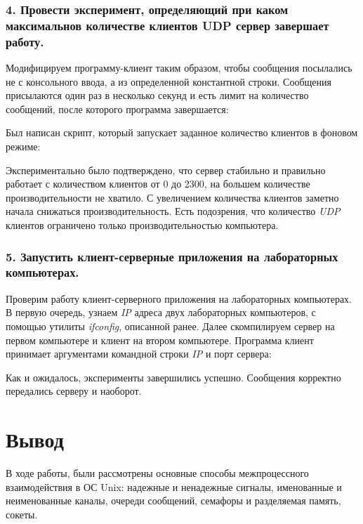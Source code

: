 \documentclass[14pt,a4paper,report]{report}
\begin{document}
\subsubsection{4. Провести эксперимент, определяющий при каком максимальнов количестве клиентов UDP сервер завершает работу.}

Модифицируем программу-клиент таким образом, чтобы сообщения посылались не с консольного ввода, а из определенной константной строки. Сообщения присылаются один раз в несколько секунд и есть лимит на количество сообщений, после которого программа завершается:



Был написан скрипт, который запускает заданное количество клиентов в фоновом режиме:



Экспериментально было подтверждено, что сервер стабильно и правильно работает с количеством клиентов от 0 до 2300, на большем количестве производительности не хватило. С увеличением количества клиентов заметно начала снижаться производительность. Есть подозрения, что количество \emph{UDP} клиентов ограничено только производительностью компьютера.

\subsubsection{5. Запустить клиент-серверные приложения на лабораторных компьютерах.}

Проверим работу клиент-серверного приложения на лабораторных компьютерах. В первую очередь, узнаем \emph{IP} адреса двух лабораторных компьютеров, с помощью утилиты \emph{ifconfig}, описанной ранее. Далее скомпилируем сервер на первом компьютере и клиент на втором компьютере. Программа клиент принимает аргументами командной строки \emph{IP} и порт сервера:





Как и ожидалось, эксперименты завершились успешно. Сообщения корректно передались серверу и наоборот.

\section{Вывод}

В ходе работы, были рассмотрены основные способы межпроцессного взаимодействия в ОС Unix: надежные и ненадежные сигналы, именованные и неименованные каналы, очереди сообщений, семафоры и разделяемая память, сокеты.
\end{document}
